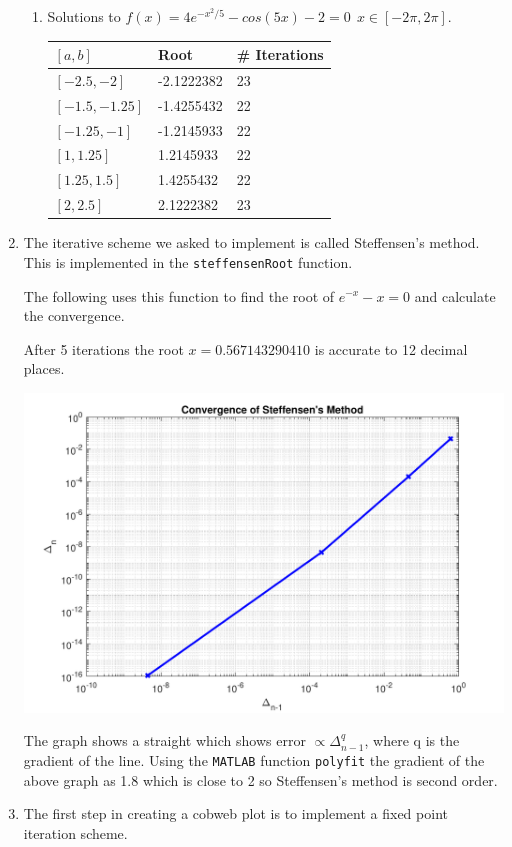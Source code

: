 \documentclass[a4paper,11pt]{article}
\begin{document}
\begin{enumerate}
\begin{enumerate}
		
		\item Solutions to $f(x) = 4e^{-x^{2}/5} - cos(5x) - 2 = 0 \  \ 
		x\in[-2\pi,2\pi]$.
		
		\begin{table}[!h]
			\centering
			\begin{tabular}{l|ll}
				$[a,b]$        & Root       & \# Iterations \\ \hline
				$[-2.5,-2]$    & -2.1222382 & 23            \\
				$[-1.5,-1.25]$ & -1.4255432 & 22            \\
				$[-1.25,-1]$   & -1.2145933 & 22            \\
				$[1,1.25]$     & 1.2145933  & 22            \\
				$[1.25,1.5]$   & 1.4255432  & 22            \\
				$[2,2.5]$      & 2.1222382  & 23           
			\end{tabular}
		\end{table}
	\end{enumerate}


	\item The iterative scheme we asked to implement is called Steffensen's 
	method. This is implemented in the \verb*|steffensenRoot| function.
	
	The following uses this function to find the root of $e^{-x} - x = 0$ and 
	calculate the convergence.
	
	After 5 iterations the root $x = 0.567143290410$ is accurate to 12 
	decimal places.
	\begin{center}
		\includegraphics[scale=0.6]{images/Q1c.pdf}
	\end{center}
	The graph shows a straight which shows error $\propto \Delta_{n-1}^{q}$, 
	where q is the gradient of the line. Using the \verb*|MATLAB| function 
	\verb*|polyfit| the gradient of the 
	above graph as 1.8 which is close to 2 so Steffensen's method is second 
	order.
	
	
	\item The first step in creating a cobweb plot is to implement a fixed 
	point iteration scheme.
	
	
\end{enumerate}
\end{document}

